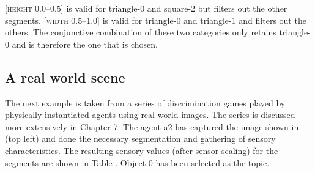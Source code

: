 [\textsc{height} 0.0–0.5] is valid for triangle-0 and square-2 but
filters out the other segments. 
[\textsc{width} 0.5–1.0] is valid for triangle-0 and triangle-1 and 
filters out the others.  
The conjunctive combination of these two categories only 
retains triangle-0 and is therefore the one that is chosen. 

\subsection{A real world scene}

The next example is taken from a series of discrimination 
games played by physically instantiated agents using 
real world images. The series is discussed more extensively 
in Chapter 7. The agent {\bfshape a2} has 
captured the image shown in 
(top left) and done the necessary segmentation and 
gathering of sensory characteristics. The resulting sensory
values (after sensor-scaling) for the segments are shown
in Table . Object-0 has been selected as the topic. 

